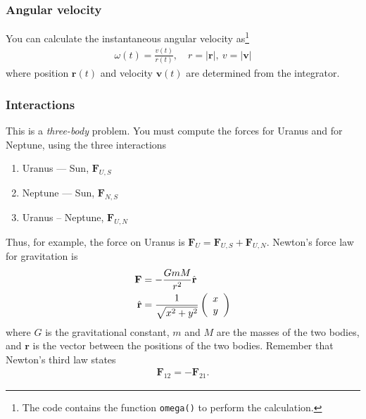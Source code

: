 \documentclass[letterpaper]{scrartcl}
\newcounter{TotalPoints}
\newcounter{TotalBonus}
\renewcommand{\vec}[1]{\ensuremath{\mathbf{#1}}}
\begin{document}
\subsubsection{Angular velocity}
\label{sec:velocity}
You can calculate the instantaneous angular velocity as\footnote{The
  code contains the function \texttt{omega()} to perform the
  calculation.}
\begin{gather*}
  \omega(t) = \frac{v(t)}{r(t)}, \quad r=|\vec{r}|,\ v=|\vec{v}|
\end{gather*}
where position $\vec{r}(t)$ and velocity $\vec{v}(t)$ are determined
from the integrator.

\subsubsection{Interactions}
\label{sec:F}

This is a \emph{three-body} problem. You must compute the forces for
Uranus and for Neptune, using the three interactions 
\begin{enumerate}
\item Uranus --- Sun, $\vec{F}_{U,S}$
\item Neptune --- Sun, $\vec{F}_{N,S}$
\item Uranus -- Neptune, $\vec{F}_{U,N}$
\end{enumerate}
Thus, for example, the force on Uranus is
$\vec{F}_{U} = \vec{F}_{U,S} + \vec{F}_{U,N}$.
%
Newton's force law for gravitation is
\begin{align}
\label{eq:gravitation}
\vec{F} &= -\frac{G m M}{r^2} \hat{\vec{r}}\\
\hat{\vec{r}} &= \frac{1}{\sqrt{x^2 + y^2}} \left(\begin{array}{c} x
                                                    \\
                                                    y \end{array}\right) \notag
\end{align}
where $G$ is the gravitational constant, $m$ and $M$ are the masses of
the two bodies, and $\vec{r}$ is the vector between the positions of
the two bodies. Remember that Newton's third law states
\begin{gather}
  \label{eq:NewtonTwo}
  \vec{F}_{12} = -\vec{F}_{21}.
\end{gather}


\end{document}
